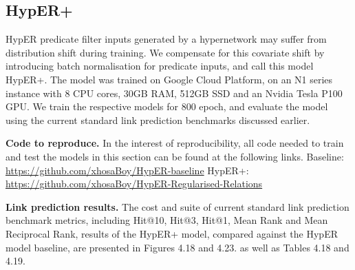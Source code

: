\subsection{HypER+}
HypER predicate filter inputs generated by a hypernetwork may suffer from distribution shift during training. We compensate for this covariate shift by introducing batch normalisation for predicate inputs, and call this model HypER+. The model was trained on Google Cloud Platform, on an N1 series instance with  8 CPU cores, 30GB RAM, 512GB SSD and an Nvidia Tesla P100 GPU. We train the respective models for $ 800 $ epoch, and evaluate the model using the current standard link prediction benchmarks discussed earlier. \par

\noindent \textbf{Code to reproduce.} In the interest of reproducibility, all code needed to train and test the models in this section can be found at the following links. \newline
Baseline: \url{https://github.com/xhosaBoy/HypER-baseline} \newline
HypER+: \url{https://github.com/xhosaBoy/HypER-Regularised-Relations} \par

\noindent \textbf{Link prediction results.} The cost and suite of current standard link prediction benchmark metrics, including Hit@10, Hit@3, Hit@1, Mean Rank and Mean Reciprocal Rank, results of the HypER+ model, compared against the HypER model baseline, are presented in Figures 4.18 and 4.23. as well as Tables 4.18 and 4.19. \par



\bigskip

